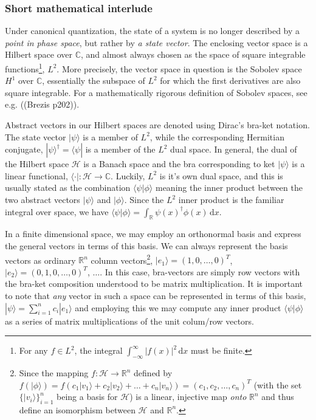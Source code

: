 \documentclass[a4paper]{article}
\newcommand{\dx}{\,\mathrm{d}x}
\newcommand{\R}{\mathbb{R}}
\newcommand{\C}{\mathbb{C}}
\begin{document}
\begin{exframe}
\subsubsection{Short mathematical interlude \label{math}}
Under canonical quantization, the state of a system is no longer described by a \emph{point in phase space}, but rather by \emph{a state vector}. The enclosing vector space is a Hilbert space over $\C$, and almost always chosen as the space of square integrable functions\footnote{For any $f\in L^2$, the integral $\int_{-\infty}^{\infty} |f(x)|^2\dx$ must be finite.}, $L^2$. More precisely, the vector space in question is the Sobolev space $H^1$ over $\C$, essentially the subspace of $L^2$ for which the first derivatives are also square integrable. For a mathematically rigorous definition of Sobolev spaces, see e.g. ((Brezis p202)).

Abstract vectors in our Hilbert spaces are denoted using Dirac's bra-ket notation. The state vector $|\psi\rangle$ is a member of $L^2$, while the corresponding Hermitian conjugate, $|\psi\rangle^\dagger= \langle \psi|$ is a member of the $L^2$ dual space. In general, the dual of the Hilbert space $\mathcal{H}$ is a Banach space and the bra corresponding to ket $|\psi\rangle$ is a linear functional, $\langle \cdot|:\mathcal{H}\rightarrow \C$. Luckily, $L^2$ is it's own dual space, and this is usually stated as the combination $\langle \psi|\phi\rangle$ meaning the inner product between the two abstract vectors $|\psi\rangle$ and $|\phi\rangle$. Since the $L^2$ inner product is the familiar integral over space, we have $\langle \psi | \phi \rangle =\int_\R \psi(x)^\dagger \phi(x)\dx$. 

In a finite dimensional space, we may employ an orthonormal basis and express the general vectors in terms of this basis. We can always represent the basis vectors as ordinary $\R^n$ column vectors\footnote{Since the mapping $f:\mathcal{H}\rightarrow \R^n$ defined by $f(|\phi\rangle)=f(c_1|v_1\rangle+c_2|v_2\rangle+\dots+c_n|v_n\rangle) = (c_1,c_2,\dots,c_n)^T$ (with the set $\{|v_i\rangle\}_{i=1}^n$ being a basis for $\mathcal{H}$) is a linear, injective map \emph{onto} $\R^n$ and thus define an isomorphism between $\mathcal{H}$ and $\R^n$.}, $|e_1\rangle=(1,0,\dots,0)^T$, $|e_2\rangle=(0,1,0,\dots,0)^T$, $\dots$. In this case, bra-vectors are simply row vectors with the bra-ket composition understood to be matrix multiplication. It is important to note that \emph{any} vector in such a space can be represented in terms of this basis, $|\psi\rangle = \sum_{i=1}^n c_i |e_1\rangle$ and employing this we may compute any inner product $\langle \psi | \phi\rangle$ as a series of matrix multiplications of the unit colum/row vectors.


\end{exframe}
\end{document}
